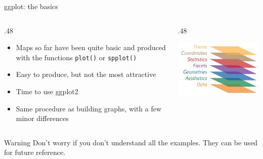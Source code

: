 \documentclass[10pt,ignorenonframetext,]{beamer}
\providecommand{\tightlist}{%
  \setlength{\itemsep}{0pt}\setlength{\parskip}{0pt}}
\def\begincols{\begin{columns}}
\def\begincol{\begin{column}}
\def\endcol{\end{column}}
\def\endcols{\end{columns}}
\begin{document}
\begin{frame}[fragile]{ggplot: the basics}

\begincols
\begincol{.48\textwidth}

\begin{itemize}
\tightlist
\item
  Maps so far have been quite basic and produced with the functions
  \texttt{plot()} or \texttt{spplot()}
\item
  Easy to produce, but not the most attractive
\item
  Time to use \alert{ggplot2}
\item
  Same procedure as building graphs, with a few minor differences
\end{itemize}

\endcol
\begincol{.48\textwidth}

\begin{center}\includegraphics[width=1\linewidth]{../images/ggplot} \end{center}

\endcol
\endcols

\begin{alertblock}{Warning}
Don't worry if you don't understand all the examples. They can be used for future reference.
\end{alertblock}

\end{frame}
\end{document}
